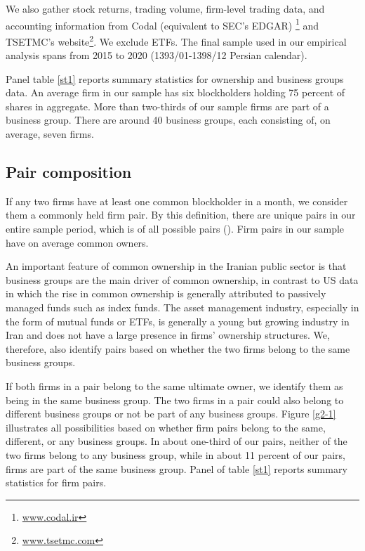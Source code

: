 	We also gather stock returns, trading volume, firm-level trading data, and accounting information from Codal (equivalent to SEC's EDGAR) \footnote{\href{http://www.codal.ir}{www.codal.ir}}
and TSETMC's website\footnote{\href{http://www.tsetmc.com}{www.tsetmc.com}}. We exclude ETFs. The final sample used in our empirical analysis spans from 2015 to 2020 (1393/01-1398/12 Persian calendar). 



Panel  table \ref{st1} reports summary statistics for ownership and business groups data. An average firm in our sample has six blockholders holding 75 percent of shares in aggregate. More than two-thirds of our sample firms are part of a business group. There are around 40 business groups, each consisting of, on average, seven firms.






\subsection{{Pair composition} }

	If any two firms have at least one common blockholder in a month, we consider them a commonly held firm pair. By this definition, there are   unique pairs in our entire sample period, which is of all possible pairs (). Firm pairs in our sample have on average common owners. 
	
	An important feature of common ownership in the Iranian public sector is that business groups are the main driver of common ownership, in contrast to US data in which the rise in common ownership is generally attributed to passively managed funds such as index funds. The asset management industry, especially in the form of mutual funds or ETFs, is generally a young but growing industry in Iran and does not have a large presence in firms' ownership structures. We, therefore, also identify pairs based on whether the two firms belong to the same business groups. 
		
		If both firms in a pair belong to the same ultimate owner, we identify them as being in the same business group. The two firms in a pair could also belong to different business groups or not be part of any business groups. Figure \ref{g2-1} illustrates all possibilities based on whether firm pairs belong to the same, different, or any business groups. In about one-third of our pairs, neither of the two firms belong to any business group, while in about 11 percent of our pairs, firms are part of the same business group. Panel  of table \ref{st1} reports summary statistics for firm pairs.
	
